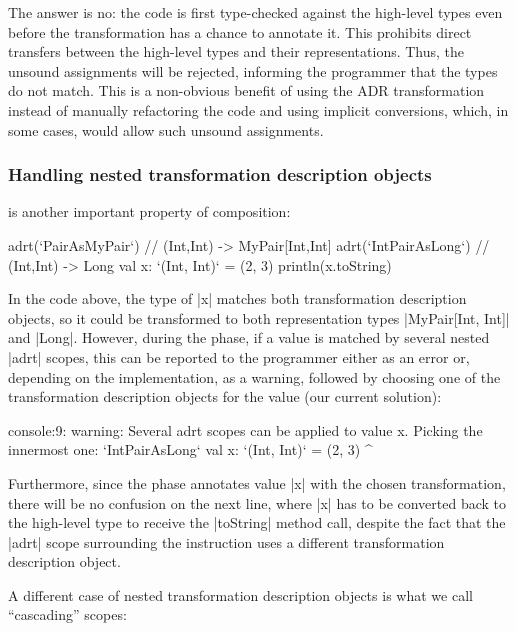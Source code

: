The answer is no: the code is first type-checked against the high-level types even before the \inject{} transformation has a chance to annotate it. This prohibits direct transfers between the high-level types and their representations. Thus, the unsound assignments will be rejected, informing the programmer that the types do not match. This is a non-obvious benefit of using the ADR transformation instead of manually refactoring the code and using implicit conversions, which, in some cases, would allow such unsound assignments.



\subsubsection*{Handling nested transformation description objects} is another important property of composition:

\begin{lstlisting-nobreak}
adrt(`PairAsMyPair`) {            // (Int,Int) -> MyPair[Int,Int]
  adrt(`IntPairAsLong`) { // (Int,Int) -> Long
    val x: `(Int, Int)` = (2, 3)
  }
  println(x.toString)
}
\end{lstlisting-nobreak}

In the code above, the type of |x| matches both transformation description objects, so it could be transformed to both representation types |MyPair[Int, Int]| and |Long|. However, during the \inject{} phase, if a value is matched by several nested |adrt| scopes, this can be reported to the programmer either as an error or, depending on the implementation, as a warning, followed by choosing one of the transformation description objects for the value (our current solution):

\begin{lstlisting-nobreak}
console:9:  warning: Several adrt scopes can be applied to value x. Picking the innermost one: `IntPairAsLong`
val x: `(Int, Int)` = (2, 3)
          ^
\end{lstlisting-nobreak}

Furthermore, since the \inject{} phase annotates value |x| with the chosen transformation, there will be no confusion on the next line, where |x| has to be converted back to the high-level type to receive the |toString| method call, despite the fact that the |adrt| scope surrounding the instruction uses a different transformation description object.

A different case of nested transformation description objects is what we call ``cascading'' scopes:

